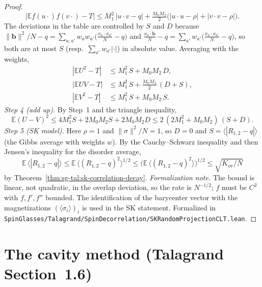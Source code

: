 \begin{proof}
\[
\Big|\mathbb{E}f(u\cdot)f(v\cdot)-T\Big|\le M_1^2\,|u\cdot v-q|+\tfrac{M_0M_2}2\big(|u\cdot u-\rho|+|v\cdot v-\rho|\big).
\]
The deviations in the table are controlled by $S$ and $D$ because $\|\mathbf b\|^2/N-q=\sum_{a,a'}w_aw_{a'}\big(\frac{x_a\cdot x_{a'}}N-q\big)$ and $\frac{x_a\cdot\mathbf b}N-q=\sum_{a'}w_{a'}\big(\frac{x_a\cdot x_{a'}}N-q\big)$, so both are at most $S$ (resp.\ $\sum_{a'}w_{a'}|\cdot|$) in absolute value. Averaging with the weights,
\begin{align*}
|\mathbb{E}U^2-T|&\le M_1^2\,S+M_0M_2\,D,\\
|\mathbb{E}UV-T|&\le M_1^2\,S+\tfrac{M_0M_2}2\,(D+S),\\
|\mathbb{E}V^2-T|&\le M_1^2\,S+M_0M_2\,S.
\end{align*}
\emph{Step 4 (add up).} By Step~1 and the triangle inequality,
\[
\mathbb{E}(U-V)^2\le 4M_1^2S+2M_0M_2S+2M_0M_2D\le 2\,(2M_1^2+M_0M_2)\,(S+D).
\]
\emph{Step 5 (SK model).} Here $\rho=1$ and $\|\sigma\|^2/N=1$, so $D=0$ and $S=\langle|R_{1,2}-q|\rangle$ (the Gibbs average with weights $w$). By the Cauchy--Schwarz inequality and then Jensen's inequality for the disorder average,
\[
\mathbb{E}\,\langle|R_{1,2}-q|\rangle\le\mathbb{E}\,\langle(R_{1,2}-q)^2\rangle^{1/2}\le\big(\mathbb{E}\,\langle(R_{1,2}-q)^2\rangle\big)^{1/2}\le\sqrt{K_{\mathrm{ov}}/N}
\]
by Theorem~\ref{thm:sg-tal:sk-correlation-decay}.
\emph{Formalization note.} The bound is linear, not quadratic, in the overlap deviation, so the rate is $N^{-1/2}$; $f$ must be $C^2$ with $f,f',f''$ bounded. The identification of the barycenter vector with the magnetizations $(\langle\sigma_i\rangle)_i$ is used in the SK statement.
Formalized in \texttt{SpinGlasses/Talagrand/SpinDecorrelation/SKRandomProjectionCLT.lean}.
\end{proof}

\section{The cavity method (Talagrand Section~1.6)}
\label{sec:sg-tal:cavity}

